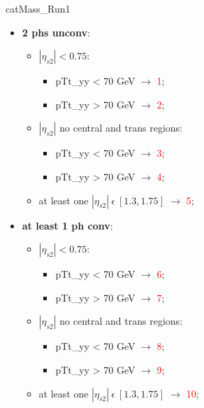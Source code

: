 \documentclass[10pt,UKenglish, leqno, xcolor = dvipsnames]{beamer}
\begin{document}
		\begin{frame}{catMass\_Run1}
			\vfill
			\begin{itemize}
				\item \textbf{2 phs unconv}:
				\begin{itemize}
					\item $|\eta_{s2}| < 0.75$:
					\begin{itemize}
						\item pTt\_yy < 70 GeV $\rightarrow$ \textcolor{red}{1};
						\item pTt\_yy > 70 GeV $\rightarrow$ \textcolor{red}{2};
					\end{itemize}
					\item $|\eta_{s2}|$ no central and trans regions:
					\begin{itemize}
						\item pTt\_yy < 70 GeV $\rightarrow$ \textcolor{red}{3};
						\item pTt\_yy > 70 GeV $\rightarrow$ \textcolor{red}{4};
					\end{itemize}
					\item at least one $|\eta_{s2}|\ \epsilon\ [1.3,1.75]$ $\rightarrow$ \textcolor{red}{5};
				\end{itemize}
				\item \textbf{at least 1 ph conv}:
				\begin{itemize}
					\item $|\eta_{s2}| < 0.75$:
					\begin{itemize}
						\item pTt\_yy < 70 GeV $\rightarrow$ \textcolor{red}{6};
						\item pTt\_yy > 70 GeV $\rightarrow$ \textcolor{red}{7};
					\end{itemize}
					\item $|\eta_{s2}|$ no central and trans regions:
					\begin{itemize}
						\item pTt\_yy < 70 GeV $\rightarrow$ \textcolor{red}{8};
						\item pTt\_yy > 70 GeV $\rightarrow$ \textcolor{red}{9};
					\end{itemize}
					\item at least one $|\eta_{s2}|\ \epsilon\ [1.3,1.75]$ $\rightarrow$ \textcolor{red}{10};
				\end{itemize}
			\end{itemize}
			\vfill
		\end{frame}
	
\end{document}

